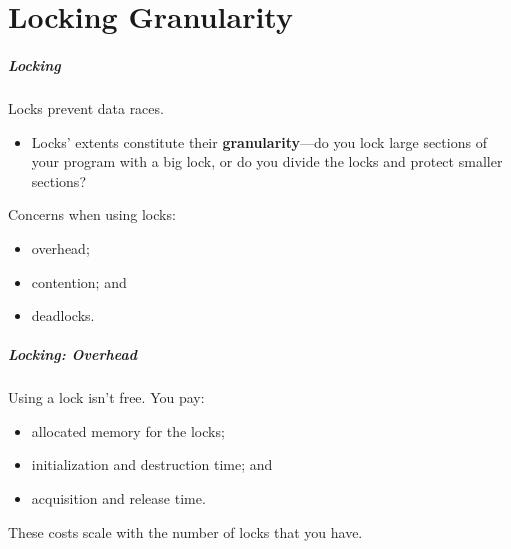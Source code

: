 \documentclass[aspectratio=43]{beamer}
\newenvironment{changemargin}[1]{%
  \begin{list}{}{%
    \setlength{\topsep}{0pt}%
    \setlength{\leftmargin}{#1}%
    \setlength{\rightmargin}{1em}
    \setlength{\listparindent}{\parindent}%
    \setlength{\itemindent}{\parindent}%
    \setlength{\parsep}{\parskip}%
  }%
  \item[]}{\end{list}}
\begin{document}

\part{Locking Granularity}
\frame{\partpage}

\begin{frame}
  \frametitle{Locking}

  \begin{changemargin}{2cm}
  Locks prevent data races.

  \begin{itemize}
    \item Locks' extents constitute their {\bf granularity}---do you lock large sections of your program with a big lock, or do you divide the locks and protect smaller sections?
  \end{itemize}

  Concerns when using locks:

  \begin{itemize}
    \item overhead;
    \item contention; and
    \item deadlocks.
  \end{itemize}
  \end{changemargin}
\end{frame}

\begin{frame}
  \frametitle{Locking: Overhead}

  \begin{changemargin}{1cm}

  Using a lock isn't free. You pay:
  \begin{itemize}
    \item allocated memory for the locks;
    \item initialization and destruction time; and
    \item acquisition and release time.
  \end{itemize}

  These costs scale with the number of locks that you have.
  \end{changemargin}
\end{frame}
\end{document}
